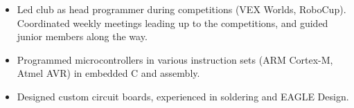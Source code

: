 
\begin{itemize}
  \item Led club as head programmer during competitions (VEX Worlds, RoboCup). Coordinated weekly meetings leading up to the competitions, and guided junior members along the way.
  \item Programmed microcontrollers in various instruction sets (ARM Cortex-M, Atmel AVR) in embedded C and assembly. 
  \item Designed custom circuit boards, experienced in soldering and EAGLE Design.
\end{itemize}